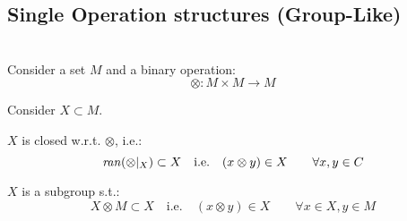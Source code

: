 \documentclass[a4paper,12pt]{scrartcl}    %
\newcommand{\OpA}{\otimes}
\begin{document}


\begin{landscape}


    \thispagestyle{empty}
    \noindent

	\begin{minipage}[t][]{0.30 \linewidth}
	    \section*{Single Operation structures (Group-Like)}
	    \mbox{}\\
		Consider a set $M$ and a binary operation:
		\begin{displaymath}
			\OpA : M \times M \rightarrow M
		\end{displaymath}
		
		Consider $X \subset M$.	
		\vfill
		\begin{definition}[Subgroup]
			$X$ is closed w.r.t. $\OpA$, i.e.:
				\begin{equation}\label{def:SubGroup}
					\ran(\OpA \vert_X )\subset X \quad \textrm{i.e.} \quad	( x \OpA y ) \in X \qquad \forall x,y\in C
				\end{equation}	
		\end{definition}
		\vfill
		\begin{definition}[Ideal]
			$X$ is a subgroup s.t.:
				\begin{equation}\label{def:Ideal}
					X \OpA M \subset X \quad \textrm{i.e.} \quad	( x \OpA y ) \in X \qquad \forall x\in X, y \in M
				\end{equation}		
		

\end{definition}
\end{minipage}
\end{landscape}
\end{document}
